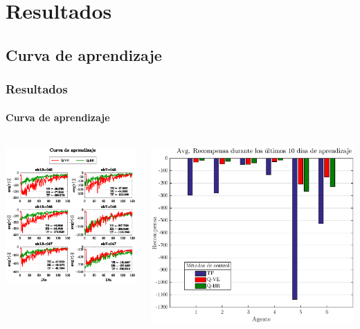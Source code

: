 \documentclass[11pt]{beamer}
\begin{document}
\section{Resultados}
\subsection{Curva de aprendizaje}
\begin{frame}
\frametitle{Resultados}
\framesubtitle{Curva de aprendizaje}
\begin{columns}[T]
\begin{column}{.47\textwidth}
\includegraphics[scale=0.7]{./graficas/rewardEvol.eps}
\end{column}
\begin{column}{.53\textwidth}
\bigskip
\medskip
\includegraphics[scale=0.4]{./graficas/lastRew2.eps}

\end{column}
\end{columns}
\end{frame}
\end{document}
